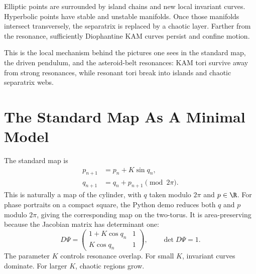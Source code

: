Elliptic points are surrounded by island chains and new local invariant curves.
Hyperbolic points have stable and unstable manifolds. Once those manifolds
intersect transversely, the separatrix is replaced by a chaotic layer. Farther
from the resonance, sufficiently Diophantine KAM curves persist and confine
motion.

This is the local mechanism behind the pictures one sees in the standard map,
the driven pendulum, and the asteroid-belt resonances: KAM tori survive away
from strong resonances, while resonant tori break into islands and chaotic
separatrix webs.

\section{The Standard Map As A Minimal Model}
\label{sec:standard-map}

The standard map is
\[
\begin{aligned}
  p_{n+1} &= p_n+K\sin q_n,\\
  q_{n+1} &= q_n+p_{n+1}\pmod{2\pi}.
\end{aligned}
\]
This is naturally a map of the cylinder, with \(q\) taken modulo \(2\pi\) and
\(p\in\R\). For phase portraits on a compact square, the Python demo reduces
both \(q\) and \(p\) modulo \(2\pi\), giving the corresponding map on the
two-torus.
It is area-preserving because the Jacobian matrix has determinant one:
\[
  D\Psi=
  \begin{pmatrix}
  1+K\cos q_n & 1\\
  K\cos q_n & 1
  \end{pmatrix},
  \qquad
  \det D\Psi=1.
\]
The parameter \(K\) controls resonance overlap. For small \(K\), invariant
curves dominate. For larger \(K\), chaotic regions grow.


